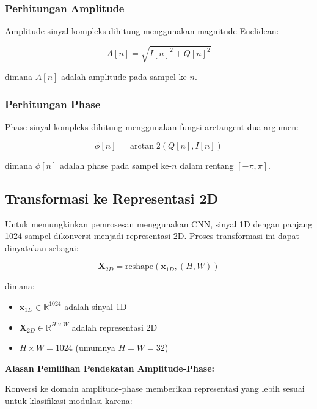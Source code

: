 \documentclass{article}
\begin{document}
\subsubsection{Perhitungan Amplitude}
Amplitude sinyal kompleks dihitung menggunakan magnitude Euclidean:

\begin{equation}
A[n] = \sqrt{I[n]^2 + Q[n]^2}
\label{eq:amplitude}
\end{equation}

dimana $A[n]$ adalah amplitude pada sampel ke-$n$.

\subsubsection{Perhitungan Phase}
Phase sinyal kompleks dihitung menggunakan fungsi arctangent dua argumen:

\begin{equation}
\phi[n] = \arctan2(Q[n], I[n])
\label{eq:phase}
\end{equation}

dimana $\phi[n]$ adalah phase pada sampel ke-$n$ dalam rentang $[-\pi, \pi]$.

\subsection{Transformasi ke Representasi 2D}
Untuk memungkinkan pemrosesan menggunakan CNN, sinyal 1D dengan panjang 1024 sampel dikonversi menjadi representasi 2D. Proses transformasi ini dapat dinyatakan sebagai:

\begin{equation}
\mathbf{X}_{2D} = \text{reshape}(\mathbf{x}_{1D}, (H, W))
\label{eq:2d_transform}
\end{equation}

dimana:
\begin{itemize}
    \item $\mathbf{x}_{1D} \in \mathbb{R}^{1024}$ adalah sinyal 1D
    \item $\mathbf{X}_{2D} \in \mathbb{R}^{H \times W}$ adalah representasi 2D
    \item $H \times W = 1024$ (umumnya $H = W = 32$)
\end{itemize}

\textbf{Alasan Pemilihan Pendekatan Amplitude-Phase:}

Konversi ke domain amplitude-phase memberikan representasi yang lebih sesuai untuk klasifikasi modulasi karena:
\end{document}
